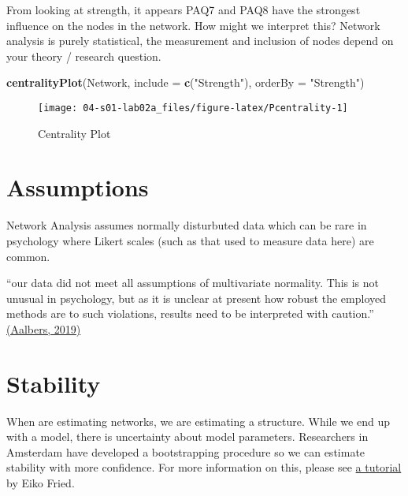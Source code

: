 \documentclass[]{book}
\newenvironment{Shaded}{\begin{snugshade}}{\end{snugshade}}
\newcommand{\DataTypeTok}[1]{\textcolor[rgb]{0.13,0.29,0.53}{#1}}
\newcommand{\KeywordTok}[1]{\textcolor[rgb]{0.13,0.29,0.53}{\textbf{#1}}}
\newcommand{\NormalTok}[1]{#1}
\newcommand{\StringTok}[1]{\textcolor[rgb]{0.31,0.60,0.02}{#1}}
\begin{document}
From looking at strength, it appears PAQ7 and PAQ8 have the strongest influence on the nodes in the network. How might we interpret this? Network analysis is purely statistical, the measurement and inclusion of nodes depend on your theory / research question.

\begin{Shaded}
\begin{Highlighting}[]
\KeywordTok{centralityPlot}\NormalTok{(Network, }\DataTypeTok{include =} \KeywordTok{c}\NormalTok{(}\StringTok{"Strength"}\NormalTok{),}
               \DataTypeTok{orderBy =} \StringTok{"Strength"}\NormalTok{)}
\end{Highlighting}
\end{Shaded}

\begin{figure}

{\centering \texttt{[image: 04-s01-lab02a\_files/figure-latex/Pcentrality-1]} 

}

\caption{Centrality Plot}\label{fig:Pcentrality}
\end{figure}

\hypertarget{assumptions}{%
\section{Assumptions}\label{assumptions}}

Network Analysis assumes normally disturbuted data which can be rare in psychology where Likert scales (such as that used to measure data here) are common.

``our data did not meet all assumptions of multivariate normality. This is not unusual in psychology, but as it is unclear at present how robust the employed methods are to such violations, results need to be interpreted with caution.'' \href{https://openaccess.leidenuniv.nl/bitstream/handle/1887/73951/Aalbers_et_al_2018_T.pdf?sequence=1}{(Aalbers, 2019)}

\hypertarget{stability}{%
\section{Stability}\label{stability}}

When are estimating networks, we are estimating a structure. While we end up with a model, there is uncertainty about model parameters. Researchers in Amsterdam have developed a bootstrapping procedure so we can estimate stability with more confidence. For more information on this, please see \href{https://psych-networks.com/r-tutorial-power-issues-robustness-network-models/}{a tutorial} by Eiko Fried.
\end{document}
